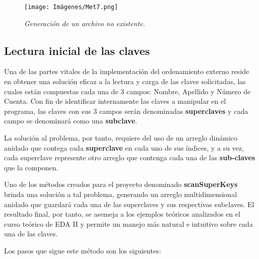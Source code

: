 \documentclass[letterpaper,12pt]{extarticle}
\begin{document}
\begin{figure}[h!]
\centering
\texttt{[image: Imágenes/Met7.png]}
\caption{\textit{Generación de un archivo no existente.}}
\label{fig:Met7}
\end{figure}


\subsection{Lectura inicial de las claves}

\noindent Una de las partes vitales de la implementación del ordenamiento externo reside en obtener una solución eficaz a la lectura y carga de las claves solicitadas, las cuales están compuestas cada una de 3 campos: Nombre, Apellido y Número de Cuenta. Con fin de identificar internamente las claves a manipular en el programa, las claves con sus 3 campos serán denominadas \textbf{superclaves} y cada campo se denominará como una \textbf{subclave}. 

La solución al problema, por tanto, requiere del uso de un arreglo dinámico anidado que contega cada \textbf{superclave} en cada uno de sus índices, y a su vez, cada superclave represente otro arreglo que contenga cada una de las \textbf{sub-claves} que la componen. 

Uno de los métodos creados para el proyecto denominado \textbf{scanSuperKeys} brinda una solución a tal problema, generando un arreglo multidimensional anidado que guardará cada una de las superclaves y sus respectivas subclaves. El resultado final, por tanto, se asemeja a los ejemplos teóricos analizados en el curso teórico de EDA II y permite un manejo más natural e intuitivo sobre cada una de las claves.

Los pasos que sigue este método son los siguientes:
\end{document}
